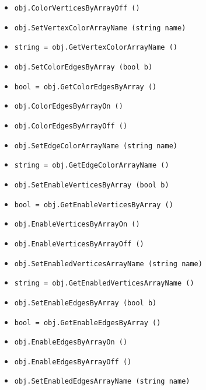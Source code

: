 \begin{itemize}
\item  \verb|obj.ColorVerticesByArrayOff ()|

\item  \verb|obj.SetVertexColorArrayName (string name)|

\item  \verb|string = obj.GetVertexColorArrayName ()|

\item  \verb|obj.SetColorEdgesByArray (bool b)|

\item  \verb|bool = obj.GetColorEdgesByArray ()|

\item  \verb|obj.ColorEdgesByArrayOn ()|

\item  \verb|obj.ColorEdgesByArrayOff ()|

\item  \verb|obj.SetEdgeColorArrayName (string name)|

\item  \verb|string = obj.GetEdgeColorArrayName ()|

\item  \verb|obj.SetEnableVerticesByArray (bool b)|

\item  \verb|bool = obj.GetEnableVerticesByArray ()|

\item  \verb|obj.EnableVerticesByArrayOn ()|

\item  \verb|obj.EnableVerticesByArrayOff ()|

\item  \verb|obj.SetEnabledVerticesArrayName (string name)|

\item  \verb|string = obj.GetEnabledVerticesArrayName ()|

\item  \verb|obj.SetEnableEdgesByArray (bool b)|

\item  \verb|bool = obj.GetEnableEdgesByArray ()|

\item  \verb|obj.EnableEdgesByArrayOn ()|

\item  \verb|obj.EnableEdgesByArrayOff ()|

\item  \verb|obj.SetEnabledEdgesArrayName (string name)|


\end{itemize}
